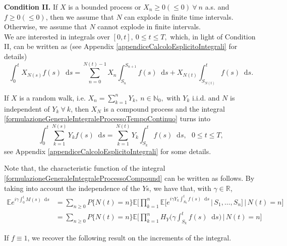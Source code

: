 \documentclass[12pt, twoside, english, headsepline]{article}
\newcommand*\dif{\mathop{}\!\mathrm{d}}  %
\theoremstyle{definition} %
\numberwithin{equation}{section} %
\begin{document}
\textbf{Condition II.} If $X$ is a bounded process or $X_n\ge0 (\le0)\ \forall\ n$ a.s. and $f\ge0(\le0)$, then we assume that $N$ can explode in finite time intervals. Otherwise, we assume that $N$ cannot explode in finite intervals.
\\

We are interested in integrals over $[0,t],\ 0\le t\le T,$ which, in light of Condition II, can be written as (see Appendix \ref{appendiceCalcoloEsplicitoIntegrali} for details)
\begin{equation}\label{formulazioneGeneraleIntegraleProcessoTempoContinuo}
\int_0^t X_{N(s)} f(s)\dif s = \sum_{n=0}^{N(t)-1} X_n\int^{S_{n+1}}_{S_n} f(s)\dif s +X_{N(t)}\int_{S_{N(t)}}^t f(s)\dif s.
\end{equation}

If $X$ is a random walk, i.e. $X_n = \sum_{k=1}^n Y_k,\ n\in\mathbb{N}_0,$ with $Y_k$ i.i.d. and $N$ is independent of $Y_k\ \forall\ k$, then $X_{N}$ is a compound process and the integral \eqref{formulazioneGeneraleIntegraleProcessoTempoContinuo} turns into
\begin{equation}\label{formulazioneGeneraleIntegraleProcessoCompound}
 \int_0^t \sum_{k=1}^{N(s)} Y_k f(s) \dif s = \sum_{k=1}^{N(t)} Y_k \int^t_{S_k} f(s) \dif s,\ \ \ 0\le t\le T,
\end{equation}
see Appendix \ref{appendiceCalcoloEsplicitoIntegrali} for some details.

Note that, the characteristic function of the integral \eqref{formulazioneGeneraleIntegraleProcessoCompound} can be written as follows. By taking into account the independence of the $Y$s, we have that, with $\gamma\in\mathbb{R}$, %
\begin{align}
	\mathbb{E} e^{ i\gamma \int_0^t M(s)  \dif s} &= \sum_{n\ge0} P\{N(t) = n\} \mathbb{E}\Bigg[\prod_{k=1}^n\mathbb{E} \Big[ e^{i\gamma Y_k \int_{S_k}^tf(s)\dif s} \,\Big|\,S_1,\dots,S_n\Big]\,|\,N(t) = n\Bigg]\nonumber\\
	& =  \sum_{n\ge0} P\{N(t) = n\} \mathbb{E}\Bigg[\prod_{k=1}^n H_Y\bigg(\gamma \int_{S_k}^tf(s)\dif s\bigg) \,|\,N(t) = n\Bigg] \label{funzioneCaratteristicaIntegraleGenerale}
\end{align}



If $f\equiv 1$, we recover the following result on the increments of the integral.
\end{document}

